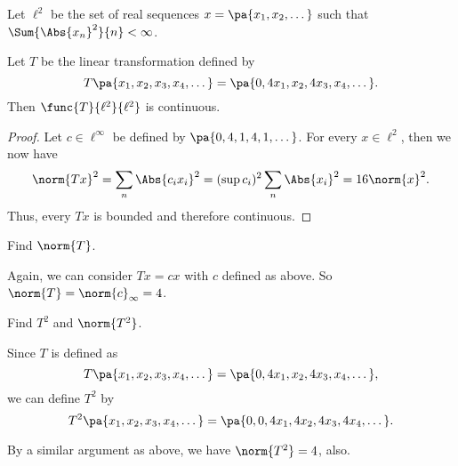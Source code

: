 \documentclass[12pt,letterpaper,twoside]{hmcpset}
\begin{document}
\begin{problem}[8][15]
 Let $\ell^2$ be the set of real sequences $x = \pa{x_1,x_2,\dotsc}$ such that $\Sum{\Abs{x_n}^2}{n} < \infty$.
\end{problem}

\begin{problem}[8a]
 Let $T$ be the linear transformation defined by \[T\pa{x_1,x_2,x_3,x_4,\dotsc} = \pa{0,4x_1,x_2,4x_3,x_4,\dotsc}.\] Then $\func{T}{\ell^2}{\ell^2}$ is continuous.
\end{problem}

\begin{solution}
 \begin{proof}
  Let $c \in \ell^\infty$ be defined by $\pa{0,4,1,4,1,\dotsc}$. For every $x 
\in \ell^2$, then we now have
  \[\norm{Tx}^2 = \sum_n\Abs{c_i x_i}^2 = (\sup c_i)^2 \sum_n 
\Abs{x_i}^2=16\norm{x}^2.\]
Thus, every $Tx$ is bounded and therefore continuous.
 \end{proof}

\end{solution}


\begin{problem}[8b]
 Find $\norm{T}$.
\end{problem}

\begin{solution}
 Again, we can consider $Tx = cx$ with $c$ defined as above. So $\norm{T} = 
\norm{c}_\infty = 4$.
\end{solution}


\begin{problem}[8c]
 Find $T^2$ and $\norm{T^2}$.
\end{problem}

\begin{solution}
 Since $T$ is defined as \[T\pa{x_1,x_2,x_3,x_4,\dotsc} = \pa{0,4x_1,x_2,4x_3,x_4,\dotsc},\] we can define $T^2$ by \[T^2\pa{x_1,x_2,x_3,x_4,\dotsc} = \pa{0,0,4x_1,4x_2,4x_3,4x_4,\dotsc}.\]
 
 By a similar argument as above, we have $\norm{T^2} = 4$, also.
\end{solution}
\end{document}
